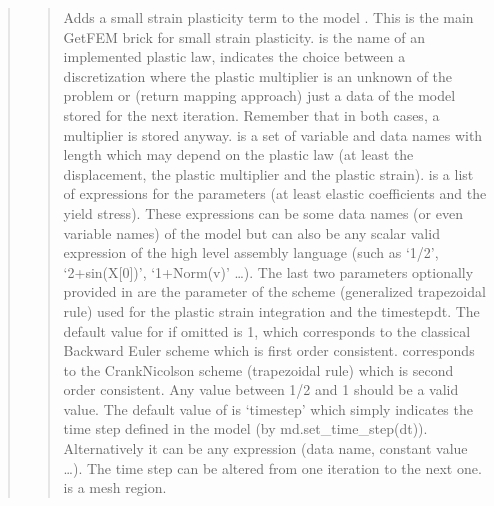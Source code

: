 \documentclass[a4paper,11pt,english]{sphinxmanual}
\begin{document}
\begin{quote}
\begin{quote}
\sphinxAtStartPar
Adds a small strain plasticity term to the model . This is the
main GetFEM brick for small strain plasticity.  is the name
of an implemented plastic law,  indicates the choice
between a discretization where the plastic multiplier is an unknown of
the problem or (return mapping approach) just a data of the model
stored for the next iteration. Remember that in both cases, a multiplier
is stored anyway.  is a set of variable and data names with
length which may depend on the plastic law (at least the displacement,
the plastic multiplier and the plastic strain).  is a list of
expressions for the parameters (at least elastic coefficients and the
yield stress). These expressions can be some data names (or even
variable names) of the model but can also be any scalar valid expression
of the high level assembly language (such as ‘1/2’, ‘2+sin(X{[}0{]})’,
‘1+Norm(v)’ …). The last two parameters optionally provided in
 are the  parameter of the \sphinxhyphen{}scheme (generalized
trapezoidal rule) used for the plastic strain integration and the
time\sphinxhyphen{}step\textasciigrave{}dt\textasciigrave{}. The default value for  if omitted is 1, which
corresponds to the classical Backward Euler scheme which is first order
consistent.  corresponds to the Crank\sphinxhyphen{}Nicolson scheme
(trapezoidal rule) which is second order consistent. Any value
between 1/2 and 1 should be a valid value. The default value of  is
‘timestep’ which simply indicates the time step defined in the model
(by md.set\_time\_step(dt)). Alternatively it can be any expression
(data name, constant value …). The time step can be altered from one
iteration to the next one.  is a mesh region.


\end{quote}
\end{quote}
\end{document}
